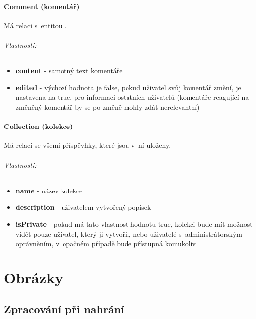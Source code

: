 \documentclass[12pt, a4paper,
  oneside,      %
]{report}
\newenvironment{propertiesItemize}{
\begin{itemize}{ 
  }}
  {\end{itemize}}
\begin{document}
\subsubsection{Comment (komentář)} Má relaci  s~entitou .
\subparagraph{Vlastnosti:}
\begin{propertiesItemize}
	\item \textbf{content} - samotný text komentáře
	\item \textbf{edited} - výchozí hodnota je false, pokud uživatel svůj komentář změní, je nastavena na true, pro informaci ostatních uživatelů (komentáře reagující na změněný komentář by se po změně mohly zdát nerelevantní)
\end{propertiesItemize}
\subsubsection{Collection (kolekce)} Má relaci  se všemi příspěvhky, které jsou v~ní uloženy.
\subparagraph{Vlastnosti:}
\begin{propertiesItemize}
	\item \textbf{name} - název kolekce
	\item \textbf{description} - uživatelem vytvořený popisek
	\item \textbf{isPrivate} - pokud má tato vlastnost hodnotu true, kolekci bude mít možnost vidět pouze uživatel, který ji vytvořil, nebo uživatelé s~administrátorským oprávněním, v~opačném případě bude přístupná komukoliv
\end{propertiesItemize}




\chapter{Obrázky}
\section{Zpracování při nahrání}
\end{document}
